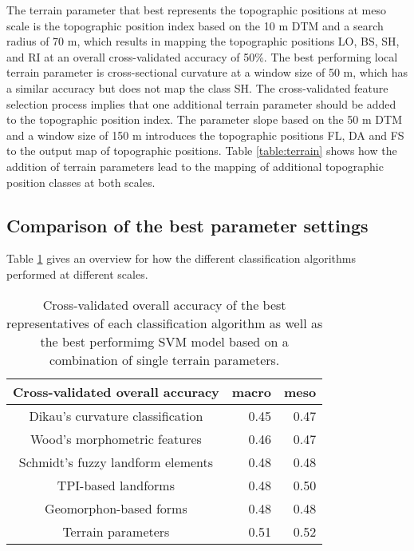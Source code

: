 \documentclass[preprint,12pt,authoryear]{elsarticle}
\begin{document}
The terrain parameter that best represents the topographic positions at meso scale is the topographic position index based on the 10 m DTM and a search radius of 70 m, which results in mapping the topographic positions LO, BS, SH, and RI at an overall cross-validated accuracy of 50\%. The best performing local terrain parameter is cross-sectional curvature at a window size of 50 m, which has a similar accuracy but does not map the class SH. The cross-validated feature selection process implies that one additional terrain parameter should be added to the topographic position index. The parameter slope based on the 50 m DTM and a window size of 150 m introduces the topographic positions FL, DA and FS to the output map of topographic positions. Table \ref{table:terrain} shows how the addition of terrain parameters lead to the mapping of additional topographic position classes at both scales.

\subsection{Comparison of the best parameter settings}
Table \ref{table:overall_comparison} gives an overview for how the different classification algorithms performed at different scales.

\begin{table}[ht]
\caption{Cross-validated overall accuracy of the best representatives of each classification algorithm as well as the best performimg SVM model based on a combination of single terrain parameters.}
\centering
\begin{tabular}{crr}
  \hline
Cross-validated overall accuracy & macro   & meso \\ 
  \hline 
Dikau's curvature classification & 0.45  & 0.47 \\ 
  Wood's morphometric features & 0.46  & 0.47  \\ 
  Schmidt's fuzzy landform elements & 0.48   & 0.48  \\ 
  TPI-based landforms & 0.48  & 0.50  \\ 
  Geomorphon-based forms & 0.48   & 0.48   \\ 
  Terrain parameters & 0.51  & 0.52   \\ 
   \hline
\end{tabular}
\label{table:overall_comparison}
\end{table}
\end{document}
